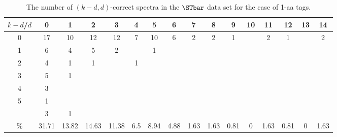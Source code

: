 \begin{landscape}

\begin{table}[h]\footnotesize
{\centering
\begin{tabular}{|c|c|
c|c|c|c|c|c|c|c|c|c|c|c|c|c|}
  \hline
  $k-d$/$d$
 & 0 & 1 & 2 & 3 & 4 & 5 & 6 & 7 & 8 & 9 & 10 & 11 & 12 & 13 & 14\\

  \hline
  \hline

0  & 17 & 10 & 12 & 12 & 7 & 10 & 6 & 2 & 2 & 1 &  & 2 & 1 &  & 2\\

1  & 6 & 4 & 5 & 2 &  & 1 &  &  &  &  &  &  &  &  & \\

2  & 4 & 1 & 1 &  & 1 &  &  &  &  &  &  &  &  &  & \\

3  & 5 & 1 &  &  &  &  &  &  &  &  &  &  &  &  & \\

4  & 3 &  &  &  &  &  &  &  &  &  &  &  &  &  & \\

5  & 1 &  &  &  &  &  &  &  &  &  &  &  &  &  & \\

\ge6  & 3 & 1 &  &  &  &  &  &  &  &  &  &  &  &  & \\

  \hline

 \%  & 31.71 & 13.82 & 14.63 & 11.38 & 6.5 & 8.94 & 4.88 & 1.63 & 1.63 & 0.81 & 0 & 1.63 & 0.81 & 0 & 1.63\\

  \hline
\end{tabular}
\par}
\centering
\caption{The number of $(k-d,d)$-correct spectra in the $\STbar$ data set for the case of 1-aa tags.}
\vspace{3mm}
\label{table:kd-1-correct-ST-bar2}
\end{table}
\end{landscape}
